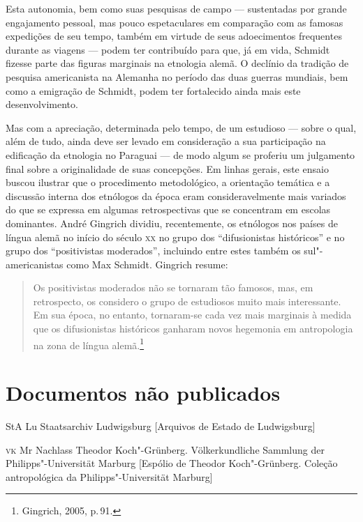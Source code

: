 Esta autonomia, bem como suas pesquisas de campo --- sustentadas por
grande engajamento pessoal, mas pouco espetaculares em comparação com
as famosas expedições de seu tempo, também em virtude de seus
adoecimentos frequentes durante as viagens --- podem ter contribuído para
que, já em vida, Schmidt fizesse parte das figuras marginais na
etnologia alemã. O declínio da tradição de pesquisa americanista na
Alemanha no período das duas guerras mundiais, bem como a emigração de
Schmidt, podem ter fortalecido ainda mais este desenvolvimento.

Mas com a apreciação, determinada pelo tempo, de um estudioso --- sobre o
qual, além de tudo, ainda deve ser levado em consideração a sua
participação na edificação da etnologia no Paraguai --- de modo algum se
proferiu um julgamento final sobre a originalidade de suas concepções.
Em linhas gerais, este ensaio buscou ilustrar que o procedimento
metodológico, a orientação temática e a discussão interna dos etnólogos
da época eram consideravelmente mais variados do que se expressa em
algumas retrospectivas que se concentram em escolas dominantes. André
Gingrich dividiu, recentemente, os etnólogos nos países de língua alemã
no início do século \textsc{xx} no grupo dos ``difusionistas históricos'' e no
grupo dos ``positivistas moderados'', incluindo entre estes também os
sul"-americanistas como Max Schmidt. Gingrich resume: 

\begin{quote}
Os positivistas moderados não se tornaram tão famosos, mas, em retrospecto, os considero o grupo de estudiosos muito mais interessante. Em sua época, no entanto, tornaram-se cada vez mais marginais à medida que os difusionistas históricos ganharam novos hegemonia em antropologia na zona de língua alemã.\footnote{Gingrich, 2005, p.\,91.}
\end{quote}


{\footnotesize
 \section{Documentos não publicados}

StA Lu Staatsarchiv Ludwigsburg {[}Arquivos de Estado de Ludwigsburg{]}

\vspace{1mm}

\noindent\textsc{vk} Mr Nachlass Theodor Koch"-Grünberg. Völkerkundliche Sammlung der
 Philipps"-Universität Marburg {[}Espólio de Theodor Koch"-Grünberg.
 Coleção antropológica da Philipps"-Universität Marburg{]}
 }

